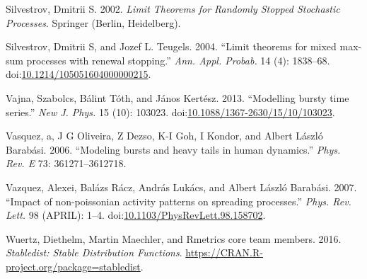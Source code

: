 \documentclass[smallextended]{svjour3}       %
\begin{document}
\hypertarget{ref-Silvestrov2002a}{}
Silvestrov, Dmitrii S. 2002. \emph{Limit Theorems for Randomly Stopped
Stochastic Processes}. Springer (Berlin, Heidelberg).

\hypertarget{ref-ST04}{}
Silvestrov, Dmitrii S, and Jozef L. Teugels. 2004. ``Limit theorems for
mixed max-sum processes with renewal stopping.'' \emph{Ann. Appl.
Probab.} 14 (4): 1838--68.
doi:\href{https://doi.org/10.1214/105051604000000215}{10.1214/105051604000000215}.

\hypertarget{ref-Vajna2013}{}
Vajna, Szabolcs, Bálint Tóth, and János Kertész. 2013. ``Modelling
bursty time series.'' \emph{New J. Phys.} 15 (10): 103023.
doi:\href{https://doi.org/10.1088/1367-2630/15/10/103023}{10.1088/1367-2630/15/10/103023}.

\hypertarget{ref-Vasquez2006}{}
Vasquez, a, J G Oliveira, Z Dezso, K-I Goh, I Kondor, and Albert László
Barabási. 2006. ``Modeling bursts and heavy tails in human dynamics.''
\emph{Phys. Rev. E} 73: 361271--3612718.

\hypertarget{ref-Vazquez2007}{}
Vazquez, Alexei, Balázs Rácz, András Lukács, and Albert László Barabási.
2007. ``Impact of non-poissonian activity patterns on spreading
processes.'' \emph{Phys. Rev. Lett.} 98 (APRIL): 1--4.
doi:\href{https://doi.org/10.1103/PhysRevLett.98.158702}{10.1103/PhysRevLett.98.158702}.

\hypertarget{ref-stabledist}{}
Wuertz, Diethelm, Martin Maechler, and Rmetrics core team members. 2016.
\emph{Stabledist: Stable Distribution Functions}.
\url{https://CRAN.R-project.org/package=stabledist}.



\end{document}
